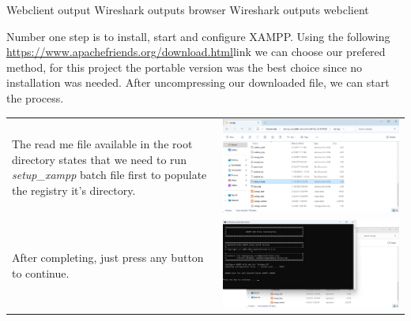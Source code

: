 \documentclass[11pt,a4paper]{report}
\begin{document}
        Webclient output
        Wireshark outputs browser
        Wireshark outputs webclient

        Number one step is to install, start and configure XAMPP. Using the following \url{https://www.apachefriends.org/download.html}{link} we can choose our prefered
        method, for this project the portable version was the best choice since no installation was needed.
        After uncompressing our downloaded file, we can start the process.
        \begin{tabular}{ l r }
            The read me file available in the root directory states that
            we need to run \textit{setup_xampp} batch file first to populate the
            registry it's directory.                                        & \includegraphics[scale=0.3]{install_xampp08} \\ %

            After completing, just press any button to continue.            & \includegraphics[scale=0.3]{install_xampp09} \\


\end{tabular}
\end{document}
